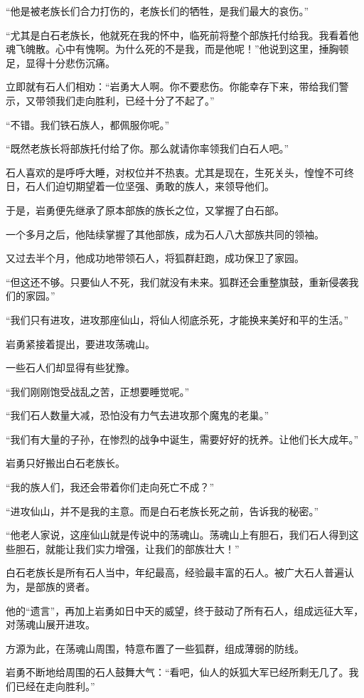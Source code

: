 \begin{this_body}
“他是被老族长们合力打伤的，老族长们的牺牲，是我们最大的哀伤。”

“尤其是白石老族长，他就死在我的怀中，临死前将整个部族托付给我。我看着他魂飞魄散。心中有愧啊。为什么死的不是我，而是他呢！”他说到这里，捶胸顿足，显得十分悲伤沉痛。

立即就有石人们相劝：“岩勇大人啊。你不要悲伤。你能幸存下来，带给我们警示，又带领我们走向胜利，已经十分了不起了。”

“不错。我们铁石族人，都佩服你呢。”

“既然老族长将部族托付给了你。那么就请你率领我们白石人吧。”

石人喜欢的是呼呼大睡，对权位并不热衷。尤其是现在，生死关头，惶惶不可终日，石人们迫切期望着一位坚强、勇敢的族人，来领导他们。

于是，岩勇便先继承了原本部族的族长之位，又掌握了白石部。

一个多月之后，他陆续掌握了其他部族，成为石人八大部族共同的领袖。

又过去半个月，他成功地带领石人，将狐群赶跑，成功保卫了家园。

“但这还不够。只要仙人不死，我们就没有未来。狐群还会重整旗鼓，重新侵袭我们的家园。”

“我们只有进攻，进攻那座仙山，将仙人彻底杀死，才能换来美好和平的生活。”

岩勇紧接着提出，要进攻荡魂山。

一些石人们却显得有些犹豫。

“我们刚刚饱受战乱之苦，正想要睡觉呢。”

“我们石人数量大减，恐怕没有力气去进攻那个魔鬼的老巢。”

“我们有大量的子孙，在惨烈的战争中诞生，需要好好的抚养。让他们长大成年。”

岩勇只好搬出白石老族长。

“我的族人们，我还会带着你们走向死亡不成？”

“进攻仙山，并不是我的主意。而是白石老族长死之前，告诉我的秘密。”

“他老人家说，这座仙山就是传说中的荡魂山。荡魂山上有胆石，我们石人得到这些胆石，就能让我们实力增强，让我们的部族壮大！”

白石老族长是所有石人当中，年纪最高，经验最丰富的石人。被广大石人普遍认为，是部族的贤者。

他的“遗言”，再加上岩勇如日中天的威望，终于鼓动了所有石人，组成远征大军，对荡魂山展开进攻。

方源为此，在荡魂山周围，特意布置了一些狐群，组成薄弱的防线。

岩勇不断地给周围的石人鼓舞大气：“看吧，仙人的妖狐大军已经所剩无几了。我们已经在走向胜利。”


\end{this_body}
